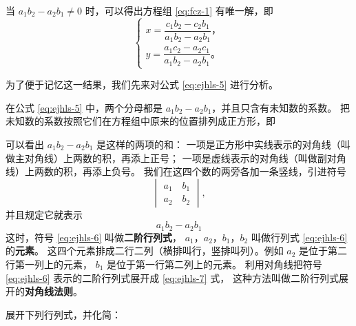 当 $a_1b_2 - a_2b_1 \neq 0$ 时，可以得出方程组 \eqref{eq:fcz-1} 有唯一解，即
\begin{equation}
    \begin{cases}
        x = \dfrac{c_1b_2 - c_2b_1}{a_1b_2 - a_2b_1} \text{，} \\[1.5em]
        y = \dfrac{a_1c_2 - a_2c_1}{a_1b_2 - a_2b_1} \text{。} \label{eq:ejhls-5}
    \end{cases}
\end{equation}

为了便于记忆这一结果，我们先来对公式 \eqref{eq:ejhls-5} 进行分析。

在公式 \eqref{eq:ejhls-5} 中，两个分母都是 $a_1b_2 - a_2b_1$，并且只含有未知数的系数。
把未知数的系数按照它们在方程组中原来的位置排列成正方形，即
\begin{figure}[H]
    \centering
    
\end{figure}
可以看出 $a_1b_2 - a_2b_1$ 是这样的两项的和：
一项是正方形中实线表示的对角线（叫做主对角线）上两数的积，再添上正号；
一项是虚线表示的对角线（叫做副对角线）上两数的积，再添上负号。
我们在这四个数的两旁各加一条竖线，引进符号
\begin{equation}
    \begin{vmatrix}
        a_1 \quad b_1 \\
        a_2 \quad b_2
    \end{vmatrix}, \label{eq:ejhls-6}
\end{equation}
并且规定它就表示
\begin{equation}
    a_1b_2 - a_2b_1 \label{eq:ejhls-7}
\end{equation}
这时，符号 \eqref{eq:ejhls-6} 叫做\textbf{二阶行列式}，
$a_1$，$a_2$，$b_1$，$b_2$ 叫做行列式 \eqref{eq:ejhls-6} 的\textbf{元素}。
这四个元素排成二行二列（横排叫行，竖排叫列）。例如 $a_2$ 是位于第二行第一列上的元素，
$b_1$ 是位于第一行第二列上的元素。
利用对角线把符号 \eqref{eq:ejhls-6} 表示的二阶行列式展开成 \eqref{eq:ejhls-7} 式，
这种方法叫做二阶行列式展开的\textbf{对角线法则}。

\liti 展开下列行列式，并化简：

